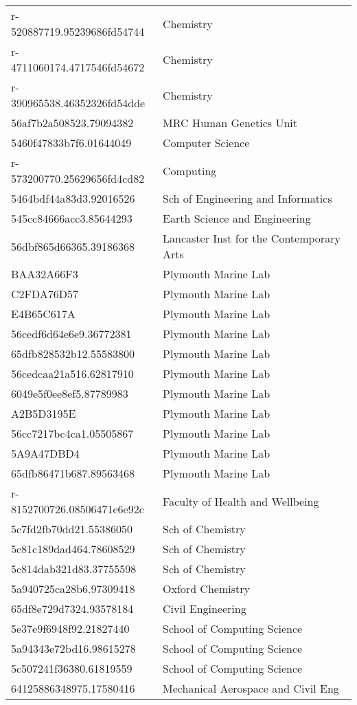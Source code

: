 \begin{tabular}{ll}
r-520887719.95239686fd54744 & Chemistry \\
r-4711060174.4717546fd54672 & Chemistry \\
r-390965538.46352326fd54dde & Chemistry \\
56af7b2a508523.79094382 & MRC Human Genetics Unit \\
5460f47833b7f6.01644049 & Computer Science \\
r-573200770.25629656fd4cd82 & Computing \\
5464bdf44a83d3.92016526 & Sch of Engineering and Informatics \\
545cc84666acc3.85644293 & Earth Science and Engineering \\
56dbf865d66365.39186368 & Lancaster Inst for the Contemporary Arts \\
BAA32A66F3 & Plymouth Marine Lab \\
C2FDA76D57 & Plymouth Marine Lab \\
E4B65C617A & Plymouth Marine Lab \\
56cedf6d64e6e9.36772381 & Plymouth Marine Lab \\
65dfb828532b12.55583800 & Plymouth Marine Lab \\
56cedcaa21a516.62817910 & Plymouth Marine Lab \\
6049e5f0ee8ef5.87789983 & Plymouth Marine Lab \\
A2B5D3195E & Plymouth Marine Lab \\
56cc7217bc4ca1.05505867 & Plymouth Marine Lab \\
5A9A47DBD4 & Plymouth Marine Lab \\
65dfb86471b687.89563468 & Plymouth Marine Lab \\
r-8152700726.08506471e6e92c & Faculty of Health and Wellbeing \\
5c7fd2fb70dd21.55386050 & Sch of Chemistry \\
5c81c189dad464.78608529 & Sch of Chemistry \\
5c814dab321d83.37755598 & Sch of Chemistry \\
5a940725ca28b6.97309418 & Oxford Chemistry \\
65df8e729d7324.93578184 & Civil Engineering \\
5e37e9f6948f92.21827440 & School of Computing Science \\
5a94343e72bd16.98615278 & School of Computing Science \\
5c507241f36380.61819559 & School of Computing Science \\
64125886348975.17580416 & Mechanical Aerospace and Civil Eng \\

\end{tabular}
